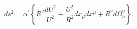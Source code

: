 \begin{equation}
ds^2=\alpha^{\prime}\left\{ R^2\frac{dU^2}{U^2}+\frac{U^2}{R^2}dx_{\mu} dx^{\mu}
+R^2d\Omega_5^2\right\}.
\label{e18}
\end{equation}

